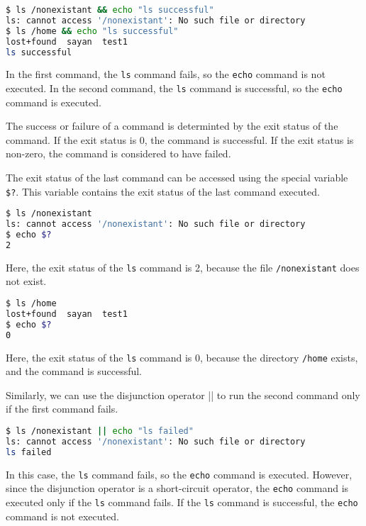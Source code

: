 \begin{lstlisting}[language=bash]
$ ls /nonexistant && echo "ls successful"
ls: cannot access '/nonexistant': No such file or directory
$ ls /home && echo "ls successful"
lost+found  sayan  test1
ls successful
\end{lstlisting}

In the first command, the \lstinline|ls| command fails, so the \lstinline|echo|
command is not executed. In the second command, the \lstinline|ls| command
is successful, so the \lstinline|echo| command is executed.

The success or failure of a command is determinted by the exit status
of the command. If the exit status is 0, the command is successful.
If the exit status is non-zero, the command is considered to have failed.

The exit status of the last command can be accessed using the special
variable \lstinline|$?|. This variable contains the exit status of the
last command executed.

\begin{lstlisting}[language=bash]
$ ls /nonexistant
ls: cannot access '/nonexistant': No such file or directory
$ echo $?
2
\end{lstlisting}

Here, the exit status of the \lstinline|ls| command is 2, because the
file \lstinline|/nonexistant| does not exist.

\begin{lstlisting}[language=bash]
$ ls /home
lost+found  sayan  test1
$ echo $?
0
\end{lstlisting}

Here, the exit status of the \lstinline|ls| command is 0, because the
directory \lstinline|/home| exists, and the command is successful.

Similarly, we can use the disjunction operator \lstinline|||| to run
the second command only if the first command fails.

\begin{lstlisting}[language=bash]
$ ls /nonexistant || echo "ls failed"
ls: cannot access '/nonexistant': No such file or directory
ls failed
\end{lstlisting}

In this case, the \lstinline|ls| command fails, so the \lstinline|echo|
command is executed. However, since the disjunction operator is a
short-circuit operator, the \lstinline|echo| command is executed only
if the \lstinline|ls| command fails. If the \lstinline|ls| command is
successful, the \lstinline|echo| command is not executed.

